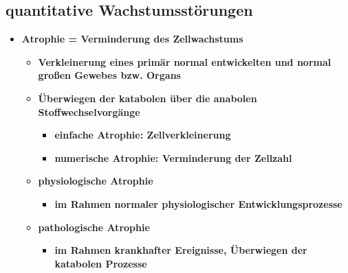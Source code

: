 \subsection{quantitative Wachstumsstörungen}
	\begin{itemize}
		\item \textbf{Atrophie = Verminderung des Zellwachstums}
			\begin{itemize}
				\item \textbf{Verkleinerung eines primär normal entwickelten und normal großen Gewebes bzw. Organs}
				\item \textbf{Überwiegen der katabolen über die anabolen Stoffwechselvorgänge}
					\begin{itemize}
						\item \textbf{einfache Atrophie: Zellverkleinerung}
						\item \textbf{numerische Atrophie: Verminderung der Zellzahl}
					\end{itemize}
				\item \textbf{physiologische Atrophie}
					\begin{itemize}
						\item \textbf{im Rahmen normaler physiologischer Entwicklungsprozesse}
					\end{itemize}
				\item \textbf{pathologische Atrophie}
					\begin{itemize}
						\item \textbf{im Rahmen krankhafter Ereignisse, Überwiegen der katabolen Prozesse}
					\end{itemize}
			\end{itemize}
	\end{itemize}
\pagebreak
